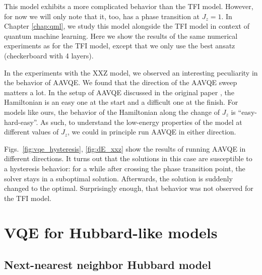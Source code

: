 This model exhibits a more complicated behavior than the TFI model. However, for now we will only note that it, too, has a phase transition at $J_z = 1$. In Chapter \ref{chap:qml}, we study this model alongside the TFI model in context of quantum machine learning. Here we show the results of the same numerical experiments as for the TFI model, except that we only use the best ansatz (checkerboard with 4 layers).

In the experiments with the XXZ model, we observed an interesting peculiarity in the behavior of AAVQE. We found that the direction of the AAVQE sweep matters a lot. In the setup of AAVQE discussed in the original paper \cite{garcia-saez_addressing_2018}, the Hamiltonian is an easy one at the start and a difficult one at the finish. For models like ours, the behavior of the Hamiltonian along the change of $J_z$ is ``easy-hard-easy''. As such, to understand the low-energy properties of the model at different values of $J_z$, we could in principle run AAVQE in either direction. 

Figs.~\ref{fig:vqe_hysteresis}, \ref{fig:dE_xxz} show the results of running AAVQE in different directions. It turns out that the solutions in this case are susceptible to a hysteresis behavior: for a while after crossing the phase transition point, the solver stays in a suboptimal solution. Afterwards, the solution is suddenly changed to the optimal. Surprisingly enough, that behavior was not observed for the TFI model.

\section{VQE for Hubbard-like models}
\label{sec:hubbard}

\subsection{Next-nearest neighbor Hubbard model}

